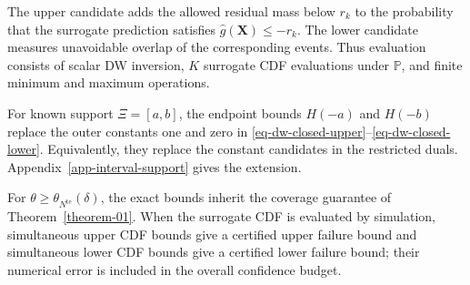 The upper candidate adds the allowed residual mass below $r_k$ to the probability that the surrogate prediction satisfies $\hat g(\bm X)\le-r_k$. The lower candidate measures unavoidable overlap of the corresponding events. Thus evaluation consists of scalar DW inversion, $K$ surrogate CDF evaluations under $\mathbb P$, and finite minimum and maximum operations.

\begin{remark}
  \label{rem-interval-support}
  For known support $\Xi=[a,b]$, the endpoint bounds $H(-a)$ and $H(-b)$ replace the outer constants one and zero in \eqref{eq-dw-closed-upper}--\eqref{eq-dw-closed-lower}. Equivalently, they replace the constant candidates in the restricted duals. Appendix~\ref{app-interval-support} gives the extension.
\end{remark}

For $\theta\ge\theta_{N^{\mathrm{te}}}(\delta)$, the exact bounds inherit the coverage guarantee of Theorem~\ref{theorem-01}. When the surrogate CDF is evaluated by simulation, simultaneous upper CDF bounds give a certified upper failure bound and simultaneous lower CDF bounds give a certified lower failure bound; their numerical error is included in the overall confidence budget.

